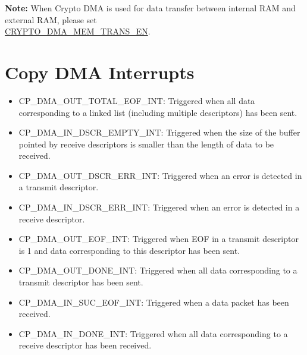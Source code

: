 \documentclass[main\_\_EN.tex]{subfiles}
\begin{document}
{\bfseries Note:} When Crypto DMA is used for data transfer between internal RAM and external RAM, please set \\ \hyperref[fielddesc:CRYPTODMAMEMTRANSEN]{CRYPTO\_DMA\_MEM\_TRANS\_EN}.

\section{Copy DMA Interrupts}
\begin{itemize}
\item \label{int:CPDMAOUTTOTALEOFINT}CP\_DMA\_OUT\_TOTAL\_EOF\_INT: Triggered when all data corresponding to a linked list (including multiple descriptors) has been sent.
\item \label{int:CPDMAINDSCREMPTYINT}CP\_DMA\_IN\_DSCR\_EMPTY\_INT: Triggered when the size of the buffer pointed by receive descriptors is smaller than the length of data to be received.
\item \label{int:CPDMAOUTDSCRERRINT}CP\_DMA\_OUT\_DSCR\_ERR\_INT: Triggered when an error is detected in a transmit descriptor.
\item \label{int:CPDMAINDSCRERRINT}CP\_DMA\_IN\_DSCR\_ERR\_INT: Triggered when an error is detected in a receive descriptor.
\item \label{int:CPDMAOUTEOFINT}CP\_DMA\_OUT\_EOF\_INT: Triggered when EOF in a transmit descriptor is 1 and data corresponding to this descriptor has been sent.
\item \label{int:CPDMAOUTDONEINT}CP\_DMA\_OUT\_DONE\_INT: Triggered when all data corresponding to a transmit descriptor has been sent.
\item \label{int:CPDMAINSUCEOFINT}CP\_DMA\_IN\_SUC\_EOF\_INT: Triggered when a data packet has been received.
\item \label{int:CPDMAINDONEINT}CP\_DMA\_IN\_DONE\_INT: Triggered when all data corresponding to a receive descriptor has been received.
\end{itemize}
\end{document}
